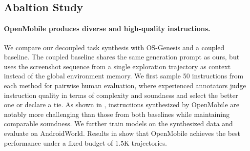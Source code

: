 \documentclass{article} %
\begin{document}
\subsection{Abaltion Study}
\label{sec:ablation}

\paragraph{OpenMobile produces diverse and high-quality instructions.}
We compare our decoupled task synthesis with OS-Genesis \citep{sun2025genesis} and a coupled baseline.
The coupled baseline shares the same generation prompt as ours, but uses the screenshot sequence from a single exploration trajectory as context instead of the global environment memory.
We first sample 50 instructions from each method for pairwise human evaluation, where experienced annotators judge instruction quality in terms of complexity and soundness and select the better one or declare a tie. As shown in , instructions synthesized by OpenMobile are notably more challenging than those from both baselines while maintaining comparable soundness.
We further train models on the synthesized data and evaluate on AndroidWorld.
Results in  show that OpenMobile achieves the best performance under a fixed budget of 1.5K trajectories.
\end{document}
